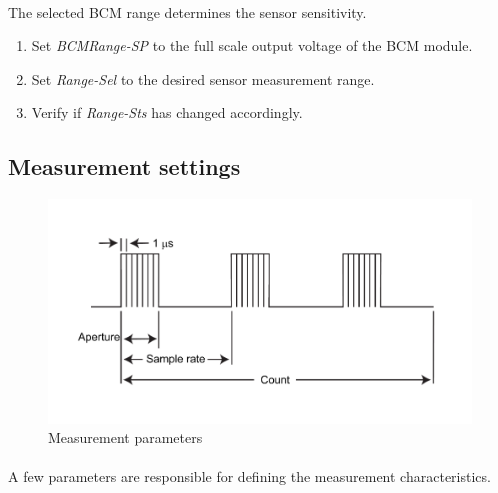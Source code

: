 \documentclass[openany]{article}
\begin{document}
		\paragraph{} The selected BCM range determines the sensor sensitivity.

			\begin{enumerate}
				\item Set \emph{BCMRange-SP} to the full scale output voltage of the BCM module.
				\item Set \emph{Range-Sel} to the desired sensor measurement range.
				\item Verify if \emph{Range-Sts} has changed accordingly.
			\end{enumerate}

	\subsection{Measurement settings}

		\begin{figure}[!h]
			\caption{Measurement parameters}
			\label{fig:meas-param}
			\centering
			\includegraphics[width=1.0\textwidth]{ict-meas-param-image}
		\end{figure}
\FloatBarrier

		\paragraph{} A few parameters are responsible for defining the measurement characteristics.
\end{document}
